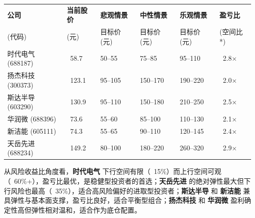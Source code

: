 \begin{exhibitbox}
\centering
\small
\setlength{\tabcolsep}{4pt}
\begin{tabularx}{\textwidth}{X C{1.5cm} C{1.7cm} C{1.7cm} C{1.7cm} C{1.4cm}}
\toprule
\centering\textbf{公司} & \textbf{当前股价} & \textbf{悲观情景} & \textbf{中性情景} & \textbf{乐观情景} & \textbf{盈亏比} \\
\centering (代码) & (元) & 目标价 (元) & 目标价 (元) & 目标价 (元) & (空间比*) \\
\midrule
{}
\centering 时代电气 \newline \scriptsize (688187) & ~58.7 & 50–55 & 75–85 & 95–110 & ~2.8× \\
\centering 扬杰科技 \newline \scriptsize (300373) & ~123.1 & 95–105 & 150–170 & 190–220 & ~2.0× \\
\centering 斯达半导 \newline \scriptsize (603290) & ~130.9 & 95–110 & 150–180 & 210–250 & ~2.5× \\
\centering 华润微 \newline \scriptsize (688396) & ~73.6 & 55–60 & 85–100 & 110–130 & ~2.1× \\
\centering 新洁能 \newline \scriptsize (605111) & ~74.3 & 55–65 & 90–110 & 120–145 & ~2.4× \\
\centering 天岳先进 \newline \scriptsize (688234) & ~149.2 & 80–100 & 180–220 & 260–320 & ~2.9× \\
\bottomrule
\end{tabularx}
\end{exhibitbox}

从风险收益比角度看，\textbf{时代电气} 下行空间有限（~15\%）而上行空间可观（~60\%+），盈亏比最优，是稳健型投资者的首选；\textbf{天岳先进} 的绝对弹性最大但下行风险也最高（~35\%），适合高风险偏好的进取型投资者；\textbf{斯达半导} 和 \textbf{新洁能} 兼具弹性与基本面支撑，盈亏比良好，适合平衡型组合；\textbf{扬杰科技} 和 \textbf{华润微} 盈利确定性高但弹性相对温和，适合作为底仓配置。

